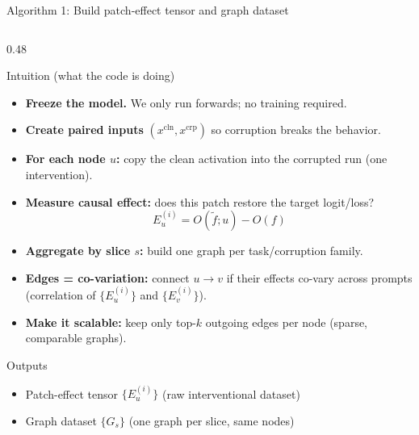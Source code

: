 \documentclass[aspectratio=169,xcolor={dvipsnames}]{beamer}
\renewcommand{\accent}[1]{\textbf{#1}}
\begin{document}
\begin{frame}[fragile,shrink=46]{Algorithm 1: Build patch-effect tensor and graph dataset}
\begin{columns}[T,onlytextwidth]
    \begin{column}{0.48\textwidth}
    \begin{block}{Intuition (what the code is doing)}
    \footnotesize
    \begin{itemize}\setlength\itemsep{4pt}
    \item \accent{Freeze the model.} We only run forwards; no training required.
    \item \accent{Create paired inputs} $(x^{\mathrm{cln}},x^{\mathrm{crp}})$ so corruption breaks the behavior.
    \item \accent{For each node $u$:} copy the clean activation into the corrupted run (one intervention).
    \item \accent{Measure causal effect:} does this patch restore the target logit/loss?
    \[
    E_u^{(i)} = O(\tilde f;u) - O(f)
    \]
    \item \accent{Aggregate by slice $s$:} build one graph per task/corruption family.
    \item \accent{Edges = co-variation:} connect $u\to v$ if their effects co-vary across prompts
    (correlation of $\{E_u^{(i)}\}$ and $\{E_v^{(i)}\}$).
    \item \accent{Make it scalable:} keep only top-$k$ outgoing edges per node (sparse, comparable graphs).
    \end{itemize}
    \end{block}

    \vspace{1mm}
    \begin{block}{Outputs}
    \footnotesize
    \begin{itemize}\setlength\itemsep{2pt}
    \item Patch-effect tensor $\{E_u^{(i)}\}$ (raw interventional dataset)
    \item Graph dataset $\{G_s\}$ (one graph per slice, same nodes)
    \end{itemize}
    \end{block}
    \end{column}
    \end{columns}
\end{frame}
\end{document}
